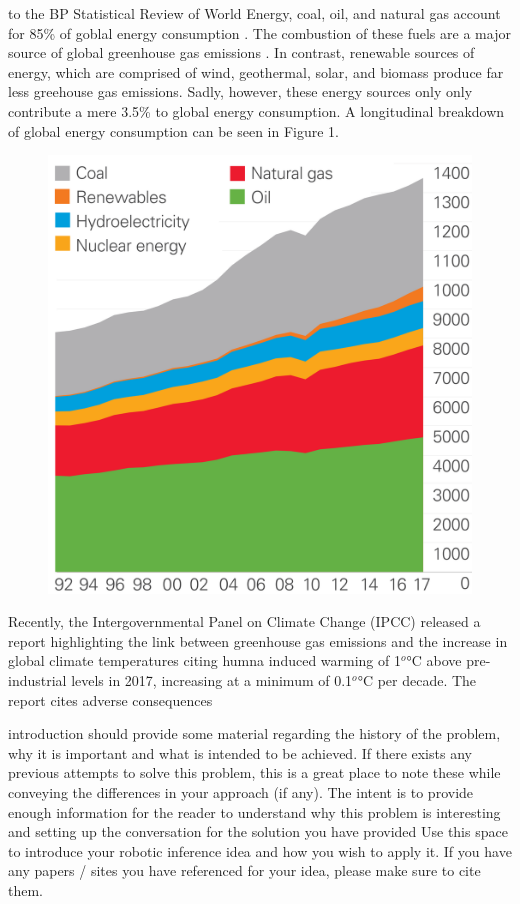 \documentclass[10pt,journal,compsoc]{IEEEtran}
\begin{document}
		 to the BP Statistical Review of World Energy, coal, oil, and natural gas account for 85\% of goblal energy consumption \cite{BP:201806}. The combustion of these fuels are a major source of global greenhouse gas emissions \cite{Azapagic:2011}. In contrast, renewable sources of energy, which are comprised of wind, geothermal, solar, and biomass produce far less greehouse gas emissions. Sadly, however, these energy sources only only contribute a mere 3.5\% to global energy consumption. A longitudinal breakdown of global energy consumption can be seen in Figure 1.
		\begin{figure}[h]
			\centering
			\includegraphics[scale=0.1]{globa_energy}
		\end{figure}
		
		
		Recently, the Intergovernmental Panel on Climate Change (IPCC) released a report highlighting the link between greenhouse gas emissions and the increase in global climate temperatures citing humna induced warming of 1$^o \si{\celsius}$ above pre-industrial levels in 2017, increasing at a minimum of 0.1$^o \si{\celsius}$ per decade. The report cites adverse consequences 
		
		introduction should provide some material regarding the history of the problem, why it is important and what is intended to be achieved. If there exists any previous attempts to solve this problem, this is a great place to note these while conveying the differences in your approach (if any). The intent is to provide enough information for the reader to understand why this problem is interesting and setting up the conversation for the solution you have provided
		Use this space to introduce your robotic inference idea and how you wish to apply it. 
		If you have any papers / sites you have referenced for your idea, please make sure to cite them.
		
\end{document}
